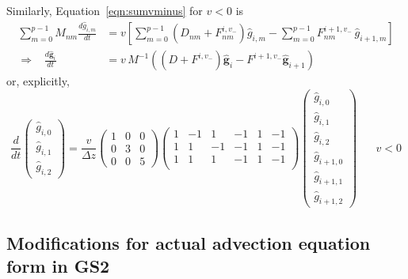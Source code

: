 \documentclass[10pt,a4paper]{article}
\begin{document}
Similarly, Equation~\ref{eqn:sumvminus} for $v < 0$ is
\begin{align*}
\sum_{m=0}^{p-1} M_{nm} \frac{d\hat{g}_{i,m}}{dt} & = v \left[
  \sum_{m=0}^{p-1} \left(D_{nm} + F_{nm}^{i,v_-}\right) \hat{g}_{i,m}
- \sum_{m=0}^{p-1} F_{nm}^{i+1,v_-}  \, \hat{g}_{i+1,m}
  \right] \\
\Longrightarrow \;\;\;
\frac{d\hat{\mathbf{g}}_{i}}{dt} & = v \, M^{-1} \left(
  \left(D + F^{i,v_-}\right)\hat{\mathbf{g}}_{i}
- F^{i+1,v_-} \hat{\mathbf{g}}_{i+1} \right)
\end{align*}
or, explicitly,
\begin{equation}
\frac{d}{dt} \left( \begin{array}{c}
\hat{g}_{i,0} \\ \hat{g}_{i,1} \\ \hat{g}_{i,2}
\end{array} \right)
=
\frac{v}{\Delta z} \left(
\begin{array}{ccc}
1 & 0 & 0 \\
0 & 3 & 0 \\
0 & 0 & 5
\end{array} \right)
\left(
\begin{array}{rrrrrr}
1 & -1 & 1 & -1 & 1 & -1 \\
1 & 1 & -1 & -1 & 1 & -1 \\
1 & 1 & 1 & -1 & 1 & -1 \\
\end{array} \right)
\left( \begin{array}{c}
\hat{g}_{i,0} \\ \hat{g}_{i,1} \\ \hat{g}_{i,2} \\
\hat{g}_{i+1,0} \\ \hat{g}_{i+1,1} \\ \hat{g}_{i+1,2}
\end{array} \right)
 \;\;\;\;\;\; v < 0
\label{eqn:fullmatrixeqnvminus}
\end{equation}

\subsection{Modifications for actual advection equation form in GS2}
\label{sec:mods}
\end{document}
